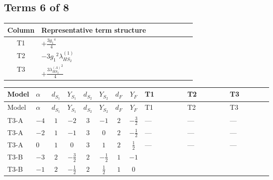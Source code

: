 \documentclass[8pt]{article}
\begin{document}
\begin{landscape}
\subsection*{Terms 6 of 8}
\begin{center}
\begin{tabular}{@{}c >{\raggedright\arraybackslash}p{0.82\linewidth}@{}}
\toprule
Column & Representative term structure \\
\midrule
T1 & \(\displaystyle +\frac{3 {g_1}^4}{4}\) \\
\midrule
T2 & \(\displaystyle -3 {g_1}^2 {\lambda_{HS_2}^{(1)}}\) \\
\midrule
T3 & \(\displaystyle +\frac{3 {\lambda_{HS_2}^{(A)}}^2}{4}\) \\
\midrule
\bottomrule
\end{tabular}
\end{center}
\smallskip
\tiny
\begin{longtable}{@{}llcccccc >{\raggedright\arraybackslash}p{0.21\linewidth} >{\raggedright\arraybackslash}p{0.21\linewidth} >{\raggedright\arraybackslash}p{0.21\linewidth}@{}}
\toprule
Model & $\alpha$ & $d_{S_1}$ & $Y_{S_1}$ & $d_{S_2}$ & $Y_{S_2}$ & $d_F$ & $Y_F$ & T1 & T2 & T3 \\
\midrule
\endfirsthead
\toprule
Model & $\alpha$ & $d_{S_1}$ & $Y_{S_1}$ & $d_{S_2}$ & $Y_{S_2}$ & $d_F$ & $Y_F$ & T1 & T2 & T3 \\
\midrule
\endhead
T3-A & $-4$ & $1$ & $-2$ & $3$ & $-1$ & $2$ & $-\frac{3}{2}$ & --- & --- & --- \\
\midrule
T3-A & $-2$ & $1$ & $-1$ & $3$ & $0$ & $2$ & $-\frac{1}{2}$ & --- & --- & --- \\
\midrule
T3-A & $0$ & $1$ & $0$ & $3$ & $1$ & $2$ & $\frac{1}{2}$ & --- & --- & --- \\
\midrule
T3-B & $-3$ & $2$ & $-\frac{3}{2}$ & $2$ & $-\frac{1}{2}$ & $1$ & $-1$ & \scriptsize\adjustbox{max width=\linewidth}{$\begin{gathered} +\frac{3 {g_1}^4}{4}\end{gathered}$} & \scriptsize\adjustbox{max width=\linewidth}{$\begin{gathered} -3 {g_1}^2 {\lambda_{HS_2}^{(1)}}\end{gathered}$} & \scriptsize\adjustbox{max width=\linewidth}{$\begin{gathered} +\frac{3 {\lambda_{HS_2}^{(A)}}^2}{4}\end{gathered}$} \\
\midrule
T3-B & $-1$ & $2$ & $-\frac{1}{2}$ & $2$ & $\frac{1}{2}$ & $1$ & $0$ & \scriptsize\adjustbox{max width=\linewidth}{$\begin{gathered} +\frac{3 {g_1}^4}{4}\end{gathered}$} & \scriptsize\adjustbox{max width=\linewidth}{$\begin{gathered} -3 {g_1}^2 {\lambda_{HS_2}^{(1)}}\end{gathered}$} & \scriptsize\adjustbox{max width=\linewidth}{$\begin{gathered} +\frac{3 {\lambda_{HS_2}^{(A)}}^2}{4}\end{gathered}$} \\

\end{longtable}
\end{landscape}
\end{document}
